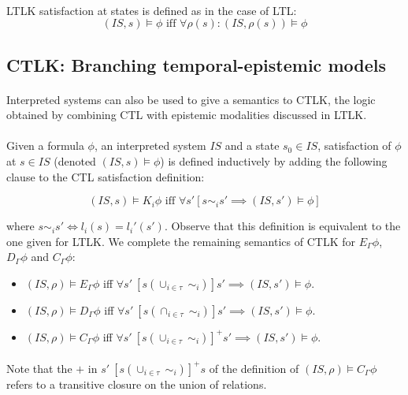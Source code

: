 \documentclass{article}
\theoremstyle{plain}
\theoremstyle{definition}
\begin{document}
\begin{multicols}{2}
\paragraph{} LTLK satisfaction at states is defined as in the case of LTL: $$(IS, s) \models \phi\text{ iff } \forall \rho(s): (IS, \rho(s)) \models \phi$$

\subsection{CTLK: Branching temporal-epistemic models}

\paragraph{} Interpreted systems can also be used to give a semantics to CTLK, the logic obtained by combining CTL with epistemic modalities discussed in LTLK. 

\paragraph{} Given a formula $\phi$, an interpreted system $IS$ and a state $s_0 \in IS$, satisfaction of $\phi$ at $s \in IS$ (denoted $(IS, s) \models \phi$) is defined inductively by adding the following clause to the CTL satisfaction definition:

$$(IS, s) \models K_i \phi\text{ iff } \forall s'[s \mathtt{\sim}_i s' \implies (IS, s') \models \phi]$$

\noindent where $s \mathtt{\sim}_i s' \Leftrightarrow l_i(s) = l_i'(s')$. Observe that this definition is equivalent to the one given for LTLK. We complete the remaining semantics of CTLK for $E_\Gamma \phi$, $D_\Gamma \phi$ and $C_\Gamma \phi$:

\begin{itemize}
\item $(IS, \rho) \models E_\Gamma \phi$ iff $\forall s'\ [s(\cup_{i \in \tau}\ \mathtt{\sim}_i)]s' \implies (IS, s') \models \phi$. 
\item $(IS, \rho) \models D_\Gamma \phi$ iff $\forall s'\ [s(\cap_{i \in \tau}\ \mathtt{\sim}_i)]s' \implies (IS, s') \models \phi$. 
\item $(IS, \rho) \models C_\Gamma \phi$ iff $\forall s'\ [s(\cup_{i \in \tau}\ \mathtt{\sim}_i)]^+s' \implies (IS, s') \models \phi$. 
\end{itemize}

\paragraph{} Note that the $+$ in $s'\ [s(\cup_{i \in \tau}\ \mathtt{\sim}_i)]^+s$ of the definition of $(IS, \rho) \models C_\Gamma \phi$ refers to a transitive closure on the union of relations.

\end{multicols}
\end{document}
